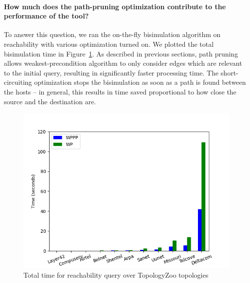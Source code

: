\paragraph{How much does the path-pruning optimization contribute to the performance of the tool?}

To answer this question, we ran the on-the-fly bisimulation algorithm
on reachability with various optimization turned on.  We plotted the
total bisimulation time in Figure~\ref{fig:graph-Q3}.  As described in
previous sections, path pruning allows weakest-precondition algorithm
to only consider edges which are relevant to the initial query,
resulting in significantly faster processing time. The
short-circuiting optimization stops the bisimulation as soon as a path
is found between the hosts -- in general, this results in time saved
proportional to how close the source and the destination are.

\begin{figure}[ht]
\begin{center}

\includegraphics[scale=0.5]{figures/rq3.png}
\end{center}
\caption{Total time for reachability query over TopologyZoo topologies}
\label{fig:graph-Q3}
\end{figure}

